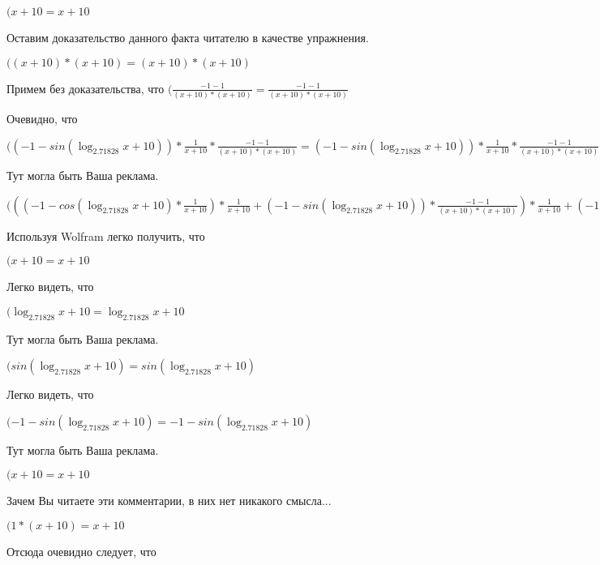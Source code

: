 \documentclass[12pt,a4paper,fleqn]{article}
\theoremstyle{definition}
\begin{document}
$( x  +  10  =  x  +  10 $

Оставим доказательство данного факта читателю в качестве упражнения.

$(( x  +  10 ) * ( x  +  10 ) = ( x  +  10 ) * ( x  +  10 )$

Примем без доказательства, что
$(\frac{ -1  -  1 }{( x  +  10 ) * ( x  +  10 )}
 = \frac{ -1  -  1 }{( x  +  10 ) * ( x  +  10 )}
$

Очевидно, что

$(( -1  - sin(\log_{ 2.71828 }{ x  +  10 })) * \frac{ 1 }{ x  +  10 }
 * \frac{ -1  -  1 }{( x  +  10 ) * ( x  +  10 )}
 = ( -1  - sin(\log_{ 2.71828 }{ x  +  10 })) * \frac{ 1 }{ x  +  10 }
 * \frac{ -1  -  1 }{( x  +  10 ) * ( x  +  10 )}
$

Тут могла быть Ваша реклама.

$((( -1  - cos(\log_{ 2.71828 }{ x  +  10 }) * \frac{ 1 }{ x  +  10 }
) * \frac{ 1 }{ x  +  10 }
 + ( -1  - sin(\log_{ 2.71828 }{ x  +  10 })) * \frac{ -1  -  1 }{( x  +  10 ) * ( x  +  10 )}
) * \frac{ 1 }{ x  +  10 }
 + ( -1  - sin(\log_{ 2.71828 }{ x  +  10 })) * \frac{ 1 }{ x  +  10 }
 * \frac{ -1  -  1 }{( x  +  10 ) * ( x  +  10 )}
 = (( -1  - cos(\log_{ 2.71828 }{ x  +  10 }) * \frac{ 1 }{ x  +  10 }
) * \frac{ 1 }{ x  +  10 }
 + ( -1  - sin(\log_{ 2.71828 }{ x  +  10 })) * \frac{ -1  -  1 }{( x  +  10 ) * ( x  +  10 )}
) * \frac{ 1 }{ x  +  10 }
 + ( -1  - sin(\log_{ 2.71828 }{ x  +  10 })) * \frac{ 1 }{ x  +  10 }
 * \frac{ -1  -  1 }{( x  +  10 ) * ( x  +  10 )}
$

Используя Wolfram легко получить, что

$( x  +  10  =  x  +  10 $

Легко видеть, что

$(\log_{ 2.71828 }{ x  +  10 } = \log_{ 2.71828 }{ x  +  10 }$

Тут могла быть Ваша реклама.

$(sin(\log_{ 2.71828 }{ x  +  10 }) = sin(\log_{ 2.71828 }{ x  +  10 })$

Легко видеть, что

$( -1  - sin(\log_{ 2.71828 }{ x  +  10 }) =  -1  - sin(\log_{ 2.71828 }{ x  +  10 })$

Тут могла быть Ваша реклама.

$( x  +  10  =  x  +  10 $

Зачем Вы читаете эти комментарии, в них нет никакого смысла...

$( 1  * ( x  +  10 ) =  x  +  10 $

Отсюда очевидно следует, что
\end{document}

